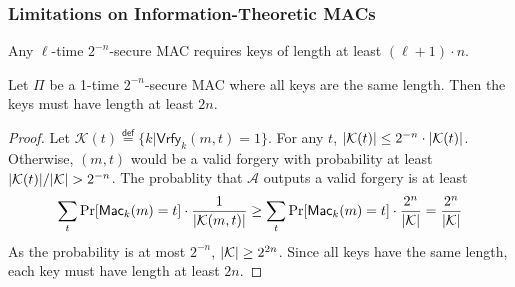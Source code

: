 \begin{frame}\frametitle{Limitations on Information-Theoretic MACs}
Any $\ell$-time $2^{-n}$-secure MAC requires keys of length at least $(\ell +1) \cdot n$. 
\begin{theorem}
Let $\Pi$ be a 1-time $2^{-n}$-secure MAC where all keys are the same length. Then the keys must have length at least $2n$.
\end{theorem}
\begin{proof}
Let $\mathcal{K}(t) \overset{\mathsf{def}}{=} \{ k | \mathsf{Vrfy}_k(m, t) = 1\}$. For any $t$, $\lvert\mathcal{K}(t)\rvert \leq 2^{-n} \cdot \lvert\mathcal{K}(t)\rvert$. Otherwise, $(m, t)$ would be a valid forgery with probability at least $\lvert\mathcal{K}(t)\rvert/\lvert\mathcal{K}\rvert> 2^{-n}$. The probablity that $\mathcal{A}$ outputs a valid forgery is at least
\[ \sum_{t} \Pr [\mathsf{Mac}_k(m) = t] \cdot \frac{1}{\lvert\mathcal{K}(m, t)\rvert} \geq \sum_{t} \Pr [\mathsf{Mac}_k(m) = t] \cdot \frac{2^n}{\lvert\mathcal{K}\rvert} = \frac{2^n}{\lvert\mathcal{K}\rvert} 
\]
As the probability is at most $2^{-n}$, $\lvert\mathcal{K}\rvert \geq 2^{2n}$. Since all keys have the same length, each key must have length at least $2n$.
\end{proof} 
\end{frame}
